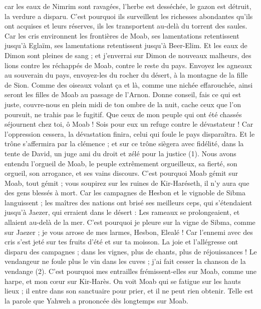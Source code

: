 \begin{multicols}{2}
car les eaux de Nimrim sont ravagées, l’herbe est desséchée, le gazon est détruit, la verdure a disparu.
C’est pourquoi ils surveillent les richesses abondantes qu’ils ont acquises et leurs réserves, ils les transportent au-delà du torrent des saules.
Car les cris environnent les frontières de Moab, ses lamentations retentissent jusqu'à Eglaïm, ses lamentations retentissent jusqu'à Beer-Elim.
Et les eaux de Dimon sont pleines de sang ; et j’enverrai sur Dimon de nouveaux malheurs, des lions contre les réchappés de Moab, contre le reste du pays.
\VerseOne{}Envoyez les agneaux au souverain du pays, envoyez-les du rocher du désert, à la montagne de la fille de Sion.
Comme des oiseaux volant ça et là, comme une nichée effarouchée, ainsi seront les filles de Moab au passage de l’Arnon.
Donne conseil, fais ce qui est juste, couvre-nous en plein midi de ton ombre de la nuit, cache ceux que l’on poursuit, ne trahis pas le fugitif.
Que ceux de mon peuple qui ont été chassés séjournent chez toi, ô Moab ! Sois pour eux un refuge contre le dévastateur ! Car l’oppression cessera, la dévastation finira, celui qui foule le pays disparaîtra.
Et le trône s’affermira par la clémence ; et sur ce trône siègera avec fidélité, dans la tente de David, un juge ami du droit et zélé pour la justice (1).
Nous avons entendu l'orgueil de Moab, le peuple extrêmement orgueilleux, sa fierté, son orgueil, son arrogance, et ses vains discours.
C'est pourquoi Moab gémit sur Moab, tout gémit ; vous soupirez sur les ruines de Kir-Haréseth, il n'y aura que des gens blessés à mort.
Car les campagnes de Hesbon et le vignoble de Sibma languissent ; les maîtres des nations ont brisé ses meilleurs ceps, qui s’étendaient jusqu’à Jaezer, qui erraient dans le désert : Les rameaux se prolongeaient, et allaient au-delà de la mer.
C'est pourquoi je pleure sur la vigne de Sibma, comme sur Jaezer ; je vous arrose de mes larmes, Hesbon, Elealé ! Car l'ennemi avec des cris s'est jeté sur tes fruits d'été et sur ta moisson.
La joie et l’allégresse ont disparu des campagnes ; dans les vignes, plus de chants, plus de réjouissances ! Le vendangeur ne foule plus le vin dans les cuves ; j’ai fait cesser la chanson de la vendange (2).
C'est pourquoi mes entrailles frémissent-elles sur Moab, comme une harpe, et mon cœur sur Kir-Harès.
On voit Moab qui se fatigue sur les hauts lieux ; il entre dans son sanctuaire pour prier, et il ne peut rien obtenir.
Telle est la parole que Yahweh a prononcée dès longtemps sur Moab.

\end{multicols}
